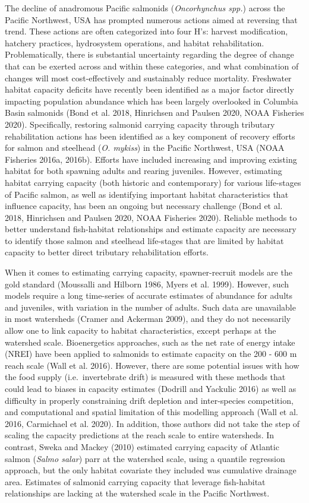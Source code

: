 \documentclass[
  12pt,
]{article}
\begin{document}
The decline of anadromous Pacific salmonids (\emph{Oncorhynchus spp.}) across the Pacific Northwest, USA has prompted numerous actions aimed at reversing that trend. These actions are often categorized into four H's: harvest modification, hatchery practices, hydrosystem operations, and habitat rehabilitation. Problematically, there is substantial uncertainty regarding the degree of change that can be exerted across and within these categories, and what combination of changes will most cost-effectively and sustainably reduce mortality. Freshwater habitat capacity deficits have recently been identified as a major factor directly impacting population abundance which has been largely overlooked in Columbia Basin salmonids (Bond et al. 2018, Hinrichsen and Paulsen 2020, NOAA Fisheries 2020). Specifically, restoring salmonid carrying capacity through tributary rehabilitation actions has been identified as a key component of recovery efforts for salmon and steelhead (\emph{O. mykiss}) in the Pacific Northwest, USA (NOAA Fisheries 2016a, 2016b). Efforts have included increasing and improving existing habitat for both spawning adults and rearing juveniles. However, estimating habitat carrying capacity (both historic and contemporary) for various life-stages of Pacific salmon, as well as identifying important habitat characteristics that influence capacity, has been an ongoing but necessary challenge (Bond et al. 2018, Hinrichsen and Paulsen 2020, NOAA Fisheries 2020). Reliable methods to better understand fish-habitat relationships and estimate capacity are necessary to identify those salmon and steelhead life-stages that are limited by habitat capacity to better direct tributary rehabilitation efforts.

When it comes to estimating carrying capacity, spawner-recruit models are the gold standard (Moussalli and Hilborn 1986, Myers et al. 1999). However, such models require a long time-series of accurate estimates of abundance for adults and juveniles, with variation in the number of adults. Such data are unavailable in most watersheds (Cramer and Ackerman 2009), and they do not necessarily allow one to link capacity to habitat characteristics, except perhaps at the watershed scale. Bioenergetics approaches, such as the net rate of energy intake (NREI) have been applied to salmonids to estimate capacity on the 200 - 600 m reach scale (Wall et al. 2016). However, there are some potential issues with how the food supply (i.e.~invertebrate drift) is measured with these methods that could lead to biases in capacity estimates (Dodrill and Yackulic 2016) as well as difficulty in properly constraining drift depletion and inter-species competition, and computational and spatial limitation of this modelling approach (Wall et al. 2016, Carmichael et al. 2020). In addition, those authors did not take the step of scaling the capacity predictions at the reach scale to entire watersheds. In contrast, Sweka and Mackey (2010) estimated carrying capacity of Atlantic salmon (\emph{Salmo salar}) parr at the watershed scale, using a quantile regression approach, but the only habitat covariate they included was cumulative drainage area. Estimates of salmonid carrying capacity that leverage fish-habitat relationships are lacking at the watershed scale in the Pacific Northwest.
\end{document}

